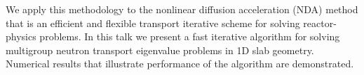 \documentclass{report}
\begin{document}
We apply this methodology to the nonlinear diffusion acceleration (NDA)
method that is an efficient and flexible transport iterative scheme for
solving reactor-physics problems. In this talk we present a fast
iterative algorithm for solving multigroup neutron transport eigenvalue
problems in 1D slab geometry. Numerical results that illustrate
performance of the algorithm are demonstrated.
\end{document}
